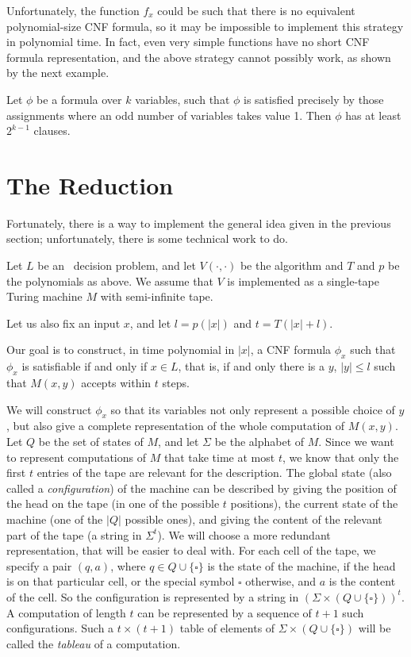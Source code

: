 Unfortunately, the function $f_x$ could be such that
there is no equivalent polynomial-size CNF formula,
so it may be impossible to implement this strategy
in polynomial time. In fact, even very simple
functions have no short CNF formula representation,
and the above strategy cannot possibly work, as shown
by the next example.

\begin {Lem}
Let $\phi$ be a formula over $k$ variables, such that
$\phi$ is satisfied precisely by those assignments where
an odd number of variables takes value 1. Then $\phi$
has at least $2^{k-1}$ clauses.
\end{Lem}

\section{The Reduction}

Fortunately, there is a way to implement the general idea
given in the previous section; unfortunately, there is
some technical work to do.

Let $L$ be an \np\ decision problem, and let $V(\cdot,\cdot)$
be the algorithm and $T$ and $p$ be the polynomials as above.
We assume that $V$ is implemented as a single-tape Turing
machine $M$ with semi-infinite tape.

Let us also fix an input $x$, and let $l = p(|x|)$ and
$t=T(|x|+l)$. 

Our goal is to construct, in time polynomial
in $|x|$, a CNF formula $\phi_x$ such that $\phi_x$ is
satisfiable if and only if $x\in L$, that is, if and only
there is a $y$, $|y| \leq l$ such that $M(x,y)$ accepts
within $t$ steps. 

We will construct $\phi_x$ so that its variables not
only represent a possible choice of $y$, but also give
a complete representation of the whole computation
of $M(x,y)$. Let $Q$ be the set of states of $M$,
and let $\Sigma$ be the alphabet of $M$. Since
we want to represent computations of $M$ that take
time at most $t$, we know that only the first $t$
entries of the tape are relevant for the description.
The global state (also called a {\em configuration})
of the machine can be described by giving the
position of the head on the tape (in one of the possible
$t$ positions), the current state of the machine
(one of the $|Q|$ possible ones), and giving the
content of the relevant part of the tape (a
string in $\Sigma^t$). We will choose a more
redundant representation, that will be easier to
deal with. For each cell of the tape, we
specify a pair $(q,a)$, where $q\in Q \cup \{ \square \}$
is the state of the machine, if the head is on
that particular cell, or the special symbol $\square$
otherwise, and $a$ is the content of the cell. So
the configuration is represented by a string in
$(\Sigma \times (Q \cup \{ \square\}))^t$.
A computation of length $t$ can be represented by
a sequence of $t+1$ such configurations. Such a
$t \times (t+1)$ table of elements of 
$\Sigma \times (Q \cup \{ \square\})$
will be called the {\em tableau} of a computation.

